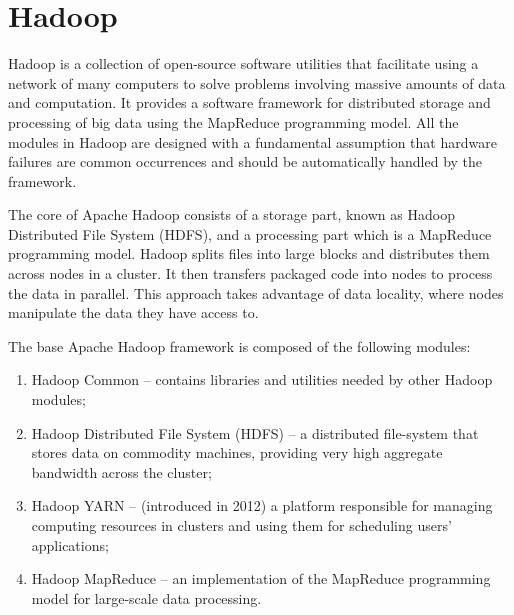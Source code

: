 \documentclass{article}
\begin{document}
\section{Hadoop}

Hadoop is a collection of open-source software utilities that facilitate using a network of many computers to solve problems involving massive amounts of data and computation. It provides a software framework for distributed storage and processing of big data using the MapReduce programming model. All the modules in Hadoop are designed with a fundamental assumption that hardware failures are common occurrences and should be automatically handled by the framework.

The core of Apache Hadoop consists of a storage part, known as Hadoop Distributed File System (HDFS), and a processing part which is a MapReduce programming model. Hadoop splits files into large blocks and distributes them across nodes in a cluster. It then transfers packaged code into nodes to process the data in parallel. This approach takes advantage of data locality, where nodes manipulate the data they have access to. 

The base Apache Hadoop framework is composed of the following modules: 
\begin{enumerate}
\item{Hadoop Common – contains libraries and utilities needed by other Hadoop modules;}
\item{Hadoop Distributed File System (HDFS) – a distributed file-system that stores data on commodity machines, providing very high aggregate bandwidth across the cluster;}
\item{Hadoop YARN – (introduced in 2012) a platform responsible for managing computing resources in clusters and using them for scheduling users' applications;}
\item{Hadoop MapReduce – an implementation of the MapReduce programming model for large-scale data processing.}
\end{enumerate}


\medskip
 


\end{document}
